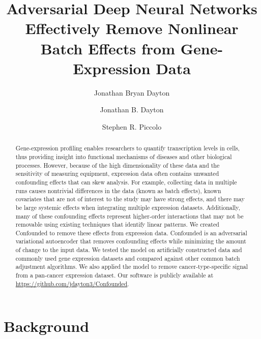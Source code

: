 \documentclass[11pt]{article}
\begin{document}
\title{Adversarial Deep Neural Networks Effectively Remove Nonlinear Batch Effects from Gene-Expression Data}
\author{Jonathan Bryan Dayton}
\author[1]{Jonathan B. Dayton}
\author[1]{Stephen R. Piccolo}

\maketitle

\begin{abstract}
	Gene-expression profiling enables researchers to quantify transcription levels in cells, thus providing insight into functional mechanisms of diseases and other biological processes.
	However, because of the high dimensionality of these data and the sensitivity of measuring equipment, expression data often contains unwanted confounding effects that can skew analysis.
	For example, collecting data in multiple runs causes nontrivial differences in the data (known as batch effects),
	known covariates that are not of interest to the study may have strong effects,
	and there may be large systemic effects when integrating multiple expression datasets.
	Additionally, many of these confounding effects represent higher-order interactions that may not be removable using existing techniques that identify linear patterns.
	We created Confounded to remove these effects from expression data.
	Confounded is an adversarial variational autoencoder that removes confounding effects while minimizing the amount of change to the input data.
	We tested the model on artificially constructed data and commonly used gene expression datasets and compared against other common batch adjustment algorithms.
	We also applied the model to remove cancer-type-specific signal from a pan-cancer expression dataset.
	Our software is publicly available at \url{https://github.com/jdayton3/Confounded}.
\end{abstract}

\doublespacing
\section{Background} \label{sec:background}
\end{document}
